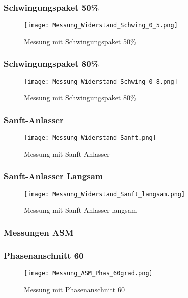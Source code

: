 \newpage
\subsubsection*{Schwingungspaket 50\%}
\begin{figure}[ht!]
	\centering
	\texttt{[image: Messung\_Widerstand\_Schwing\_0\_5.png]}	
	\caption{Messung mit Schwingungspaket 50\%}\label{fig:Mess_Schwing_50}
\end{figure}

\newpage
\subsubsection*{Schwingungspaket 80\%}
\begin{figure}[ht!]
	\centering
	\texttt{[image: Messung\_Widerstand\_Schwing\_0\_8.png]}	
	\caption{Messung mit Schwingungspaket 80\%}\label{fig:Mess_Schwing_80}
\end{figure}

\newpage
\subsubsection*{Sanft-Anlasser}
\begin{figure}[ht!]
	\centering
	\texttt{[image: Messung\_Widerstand\_Sanft.png]}	
	\caption{Messung mit Sanft-Anlasser}\label{fig:Mess_Sanft}
\end{figure}

\newpage
\subsubsection*{Sanft-Anlasser Langsam}
\begin{figure}[ht!]
	\centering
	\texttt{[image: Messung\_Widerstand\_Sanft\_langsam.png]}	
	\caption{Messung mit Sanft-Anlasser langsam}\label{fig:Mess_Sanft_langsam}
\end{figure}

\newpage
\subsubsection{Messungen ASM}

\subsubsection*{Phasenanschnitt 60\textdegree}
\begin{figure}[ht!]
	\centering
	\texttt{[image: Messung\_ASM\_Phas\_60grad.png]}	
	\caption{Messung mit Phasenanschnitt 60\textdegree}\label{fig:Mess_ASM_Phas60}
\end{figure}

